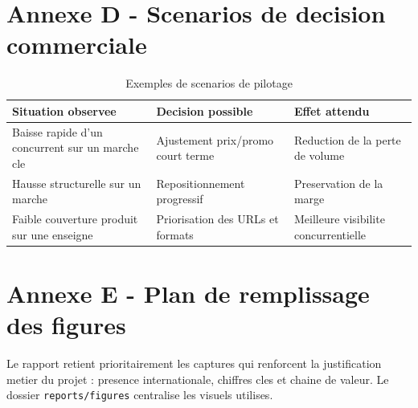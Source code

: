 \section{Annexe D - Scenarios de decision commerciale}
\begin{table}[H]
\centering
\caption{Exemples de scenarios de pilotage}
\begin{tabular}{p{4.1cm}p{4.9cm}p{4.3cm}}
\toprule
\textbf{Situation observee} & \textbf{Decision possible} & \textbf{Effet attendu} \\
\midrule
Baisse rapide d'un concurrent sur un marche cle & Ajustement prix/promo court terme & Reduction de la perte de volume \\
Hausse structurelle sur un marche & Repositionnement progressif & Preservation de la marge \\
Faible couverture produit sur une enseigne & Priorisation des URLs et formats & Meilleure visibilite concurrentielle \\
\bottomrule
\end{tabular}
\end{table}

\section{Annexe E - Plan de remplissage des figures}
Le rapport retient prioritairement les captures qui renforcent la justification metier du projet : presence internationale, chiffres cles et chaine de valeur. Le dossier \texttt{reports/figures} centralise les visuels utilises.

\clearpage
